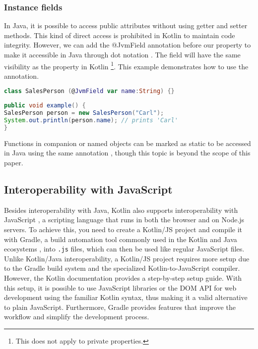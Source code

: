 \documentclass[a4paper,11pt]{article}
\begin{document}
\subsubsection{Instance fields}
In Java, it is possible to access public attributes without using getter and setter methods. This kind of direct access is prohibited in Kotlin to maintain code integrity. However, we can add the @JvmField annotation before our property to make it accessible in Java through dot notation \cite{interop-instance-fields}. The field will have the same visibility as the property in Kotlin \footnote{This does not apply to private properties.}.
This example demonstrates how to use the annotation.
\begin{lstlisting}[language=Kotlin]
class SalesPerson (@JvmField var name:String) {}
\end{lstlisting}
\begin{lstlisting}[language=Java]
public void example() {
SalesPerson person = new SalesPerson("Carl");
System.out.println(person.name); // prints 'Carl'
}
\end{lstlisting}

Functions in companion or named objects can be marked as static to be accessed in Java using the same annotation \cite{interop-static-fields}, though this topic is beyond the scope of this paper.

\subsection{Interoperability with JavaScript}
Besides interoperability with Java, Kotlin also supports interoperability with JavaScript \cite{interopjs}, a scripting language that runs in both the browser and on Node.js servers. To achieve this, you need to create a Kotlin/JS project and compile it with Gradle, a build automation tool commonly used in the Kotlin and Java ecosystems \cite{gradle}, into \texttt{.js} files, which can then be used like regular JavaScript files. Unlike Kotlin/Java interoperability, a Kotlin/JS project requires more setup due to the Gradle build system and the specialized Kotlin-to-JavaScript compiler. However, the Kotlin documentation \cite{interopjs} provides a step-by-step setup guide. With this setup, it is possible to use JavaScript libraries or the DOM API \cite{interopjs-dom} for web development using the familiar Kotlin syntax, thus making it a valid alternative to plain JavaScript. Furthermore, Gradle provides features that improve the workflow and simplify the development process.
\end{document}
